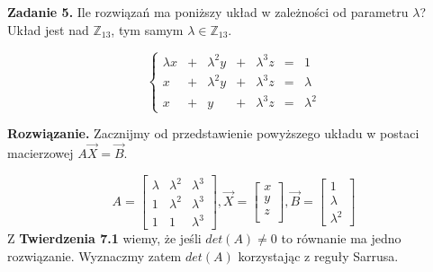 \documentclass[12pt,a4paper]{article}
\begin{document}
\noindent
\textbf {Zadanie 5. }
Ile rozwiązań ma poniższy układ w zależności od parametru \(\lambda\)? Układ jest nad \(\mathbb{Z}_{13}\), tym samym \(\lambda\in\mathbb{Z}_{13}\).

\[
\left\{ 
\begin{array}{llllllll}
\lambda x & + & \lambda^2y & + &\lambda^3z & = & 1\\ 
x & + & \lambda^2y & + &\lambda^3z & = & \lambda\\ 
x & + & y& + &\lambda^3z & = & \lambda^2
\end{array} \right.
\]

\textbf{Rozwiązanie. }
Zacznijmy od przedstawienie powyższego układu w postaci macierzowej \(A\vec{X}=\vec{B}\).

\[
A=
\left[
\begin{array}{ccc}
\lambda & \lambda^2 & \lambda^3\\
1 & \lambda^2 & \lambda^3 \\
1 & 1 & \lambda^3
\end{array}\right]
,\vec{X}=
\left[
\begin{array}{c}
x\\
y\\
z\\
\end{array}\right]
,\vec{B}=
\left[
\begin{array}{c}
1\\
\lambda\\
\lambda^2
\end{array}\right]
\]
Z \textbf{Twierdzenia 7.1} wiemy, że jeśli \(det(A)\ne0\) to równanie ma jedno rozwiązanie. Wyznaczmy zatem \(det(A)\) korzystając z reguły Sarrusa.
\end{document}
